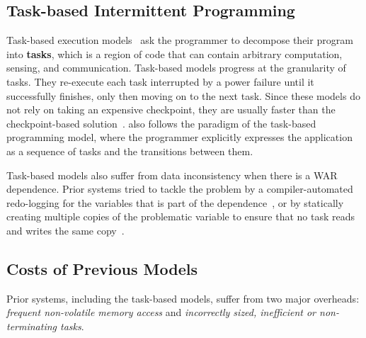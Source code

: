 \subsection{Task-based Intermittent Programming}
\label{section:background_task_computing}

Task-based execution models~\cite{dino,chain,alpaca} ask the programmer to
decompose their program into \textbf{tasks}, which is a region of code that can contain
arbitrary computation, sensing, and communication.  Task-based models progress at the granularity of tasks. They re-execute each task interrupted by a power failure until it successfully finishes, only then moving on to
the next task. Since these models do not rely on taking an expensive
checkpoint, they are usually faster than the checkpoint-based
solution~\cite{chain, alpaca}.  \sys also follows the paradigm of the
task-based programming model, where the programmer explicitly expresses the
application as a sequence of tasks and the transitions between them.

Task-based models also suffer from data inconsistency when there is a WAR
dependence.  Prior systems tried to tackle the problem by a compiler-automated
redo-logging for the variables that is part of the dependence~\cite{alpaca}, or
by statically creating multiple copies of the problematic variable to ensure
that no task reads and writes the same copy~\cite{chain}.

\subsection{Costs of Previous Models}
\label{sec:cost_task-based}

Prior systems, including the task-based models, suffer from two major overheads:
{\em frequent non-volatile memory access} and {\em incorrectly sized, inefficient or non-terminating tasks}.

